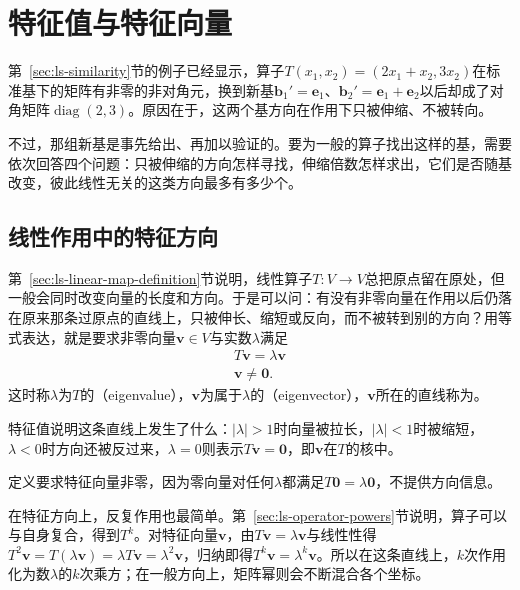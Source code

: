 
\section{特征值与特征向量}
\label{sec:ls-linear-operators}

第~\ref{sec:ls-similarity}节的例子已经显示，算子$T(x_1,x_2)=(2x_1+x_2,3x_2)$在标准基下的矩阵有非零的非对角元，换到新基$\bm b_1'=\bm e_1$、$\bm b_2'=\bm e_1+\bm e_2$以后却成了对角矩阵$\operatorname{diag}(2,3)$。原因在于，这两个基方向在作用下只被伸缩、不被转向。

不过，那组新基是事先给出、再加以验证的。要为一般的算子找出这样的基，需要依次回答四个问题：只被伸缩的方向怎样寻找，伸缩倍数怎样求出，它们是否随基改变，彼此线性无关的这类方向最多有多少个。

\subsection{线性作用中的特征方向}
\label{sec:ls-operator-eigenvectors}

第~\ref{sec:ls-linear-map-definition}节说明，线性算子$T:V\to V$总把原点留在原处，但一般会同时改变向量的长度和方向。于是可以问：有没有非零向量在作用以后仍落在原来那条过原点的直线上，只被伸长、缩短或反向，而不被转到别的方向？用等式表达，就是要求非零向量$\bm v\in V$与实数$\lambda$满足
\begin{equation}
\begin{gathered}
T\bm v=\lambda\bm v\\
\bm v\neq\bm0.
\end{gathered}
\label{eq:matrix-analysis-eigenpair}
\end{equation}
这时称$\lambda$为$T$的（eigenvalue），$\bm v$为属于$\lambda$的（eigenvector），$\bm v$所在的直线称为。

特征值说明这条直线上发生了什么：$|\lambda|>1$时向量被拉长，$|\lambda|<1$时被缩短，$\lambda<0$时方向还被反过来，$\lambda=0$则表示$T\bm v=\bm0$，即$\bm v$在$T$的核中。

定义要求特征向量非零，因为零向量对任何$\lambda$都满足$T\bm0=\lambda\bm0$，不提供方向信息。

在特征方向上，反复作用也最简单。第~\ref{sec:ls-operator-powers}节说明，算子可以与自身复合，得到$T^k$。对特征向量$\bm v$，由$T\bm v=\lambda\bm v$与线性性得$T^2\bm v=T(\lambda\bm v)=\lambda T\bm v=\lambda^2\bm v$，归纳即得$T^k\bm v=\lambda^k\bm v$。所以在这条直线上，$k$次作用化为数$\lambda$的$k$次乘方；在一般方向上，矩阵幂则会不断混合各个坐标。

